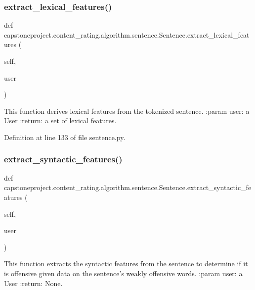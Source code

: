 \subsubsection{\texorpdfstring{extract\+\_\+lexical\+\_\+features()}{extract\_lexical\_features()}}
{\footnotesize\ttfamily def capstoneproject.\+content\+\_\+rating.\+algorithm.\+sentence.\+Sentence.\+extract\+\_\+lexical\+\_\+features (\begin{DoxyParamCaption}\item[{}]{self,  }\item[{}]{user }\end{DoxyParamCaption})}

\begin{DoxyVerb}This function derives lexical features from the tokenized sentence.
:param user: a User
:return: a set of lexical features.
\end{DoxyVerb}
 

Definition at line 133 of file sentence.\+py.

\mbox{\label{classcapstoneproject_1_1content__rating_1_1algorithm_1_1sentence_1_1_sentence_a26ca4c3cb962ba7d6984f4114ee58968}} 
\subsubsection{\texorpdfstring{extract\+\_\+syntactic\+\_\+features()}{extract\_syntactic\_features()}}
{\footnotesize\ttfamily def capstoneproject.\+content\+\_\+rating.\+algorithm.\+sentence.\+Sentence.\+extract\+\_\+syntactic\+\_\+features (\begin{DoxyParamCaption}\item[{}]{self,  }\item[{}]{user }\end{DoxyParamCaption})}

\begin{DoxyVerb}This function extracts the syntactic features from the sentence to
determine if it is offensive given data on the sentence's weakly offensive words.
:param user: a User
:return: None.
\end{DoxyVerb}
 

